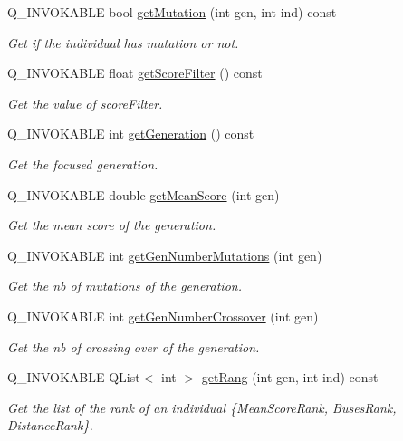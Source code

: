 \begin{DoxyCompactItemize}
Q\+\_\+\+I\+N\+V\+O\+K\+A\+B\+LE bool \hyperlink{class_generation_table_model_a967452056ba563c77369bfbec87e8cec}{get\+Mutation} (int gen, int ind) const
\begin{DoxyCompactList}\small\item\em Get if the individual has mutation or not. \end{DoxyCompactList}\item 
Q\+\_\+\+I\+N\+V\+O\+K\+A\+B\+LE float \hyperlink{class_generation_table_model_aed119ccb032745029bebd626385b396d}{get\+Score\+Filter} () const
\begin{DoxyCompactList}\small\item\em Get the value of score\+Filter. \end{DoxyCompactList}\item 
Q\+\_\+\+I\+N\+V\+O\+K\+A\+B\+LE int \hyperlink{class_generation_table_model_a9f3637c9c02f8ae5f27084335672cbbf}{get\+Generation} () const
\begin{DoxyCompactList}\small\item\em Get the focused generation. \end{DoxyCompactList}\item 
Q\+\_\+\+I\+N\+V\+O\+K\+A\+B\+LE double \hyperlink{class_generation_table_model_ae2feb02d1d61e5a2d199c6b766334613}{get\+Mean\+Score} (int gen)
\begin{DoxyCompactList}\small\item\em Get the mean score of the generation. \end{DoxyCompactList}\item 
Q\+\_\+\+I\+N\+V\+O\+K\+A\+B\+LE int \hyperlink{class_generation_table_model_a71714de38cb532f42e72e6bb7c757243}{get\+Gen\+Number\+Mutations} (int gen)
\begin{DoxyCompactList}\small\item\em Get the nb of mutations of the generation. \end{DoxyCompactList}\item 
Q\+\_\+\+I\+N\+V\+O\+K\+A\+B\+LE int \hyperlink{class_generation_table_model_a6f86eb139344f0059ccddc2c44d433aa}{get\+Gen\+Number\+Crossover} (int gen)
\begin{DoxyCompactList}\small\item\em Get the nb of crossing over of the generation. \end{DoxyCompactList}\item 
Q\+\_\+\+I\+N\+V\+O\+K\+A\+B\+LE Q\+List$<$ int $>$ \hyperlink{class_generation_table_model_a46e66d82198f53e67a5b085908bf33e6}{get\+Rang} (int gen, int ind) const
\begin{DoxyCompactList}\small\item\em Get the list of the rank of an individual \{Mean\+Score\+Rank, Buses\+Rank, Distance\+Rank\}. \end{DoxyCompactList}\end{DoxyCompactItemize}
